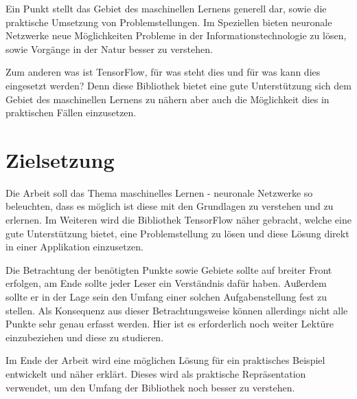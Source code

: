 \noindent
Ein Punkt stellt das Gebiet des maschinellen Lernens generell dar, sowie die praktische Umsetzung von Problemstellungen. 
Im Speziellen bieten neuronale Netzwerke neue Möglichkeiten Probleme in der Informationstechnologie zu lösen, sowie Vorgänge in der Natur besser zu verstehen. \newline

\noindent
Zum anderen was ist TensorFlow, für was steht dies und für was kann dies eingesetzt werden?  
Denn diese Bibliothek bietet eine gute Unterstützung sich dem Gebiet des maschinellen Lernens zu nähern aber auch die Möglichkeit dies in praktischen Fällen einzusetzen. 


\section{Zielsetzung}


Die Arbeit soll das Thema maschinelles Lernen - neuronale Netzwerke so beleuchten, dass es möglich ist diese mit den Grundlagen zu verstehen und zu erlernen. 
Im Weiteren wird die Bibliothek TensorFlow näher gebracht, welche eine gute Unterstützung bietet, eine Problemstellung zu lösen und diese Lösung direkt in einer Applikation einzusetzen. \newline

\noindent
Die Betrachtung der benötigten Punkte sowie Gebiete sollte auf breiter Front erfolgen, am Ende sollte jeder Leser ein Verständnis dafür haben. 
Außerdem sollte er in der Lage sein den Umfang einer solchen Aufgabenstellung fest zu stellen. 
Als Konsequenz aus dieser Betrachtungsweise können allerdings nicht alle Punkte sehr genau erfasst werden. 
Hier ist es erforderlich noch weiter Lektüre einzubeziehen und diese zu studieren. \newline

\noindent
Im Ende der Arbeit wird eine möglichen Lösung für ein praktisches Beispiel entwickelt und näher erklärt.
Dieses wird als praktische Repräsentation verwendet, um den Umfang der Bibliothek noch besser zu verstehen. \newline

